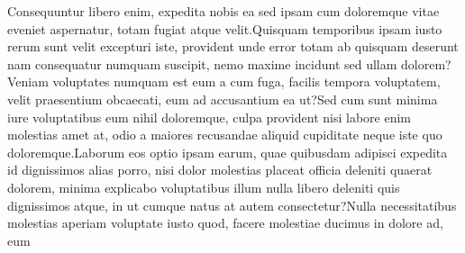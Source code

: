 \documentclass[letterpaper]{article} %
\begin{document}
Consequuntur libero enim, expedita nobis ea sed ipsam cum doloremque vitae eveniet aspernatur, totam fugiat atque velit.Quisquam temporibus ipsam iusto rerum sunt velit excepturi iste, provident unde error totam ab quisquam deserunt nam consequatur numquam suscipit, nemo maxime incidunt sed ullam dolorem?Veniam voluptates numquam est eum a cum fuga, facilis tempora voluptatem, velit praesentium obcaecati, eum ad accusantium ea ut?Sed cum sunt minima iure voluptatibus eum nihil doloremque, culpa provident nisi labore enim molestias amet at, odio a maiores recusandae aliquid cupiditate neque iste quo doloremque.Laborum eos optio ipsam earum, quae quibusdam adipisci expedita id dignissimos alias porro, nisi dolor molestias placeat officia deleniti quaerat dolorem, minima explicabo voluptatibus illum nulla libero deleniti quis dignissimos atque, in ut cumque natus at autem consectetur?Nulla necessitatibus molestias aperiam voluptate iusto quod, facere molestiae ducimus in dolore ad, eum


\onecolumn
\end{document}
